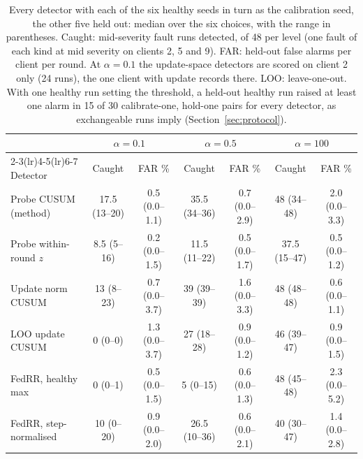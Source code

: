 \begin{table}[t]
\centering
\footnotesize
\setlength{\tabcolsep}{3pt}
\begin{tabular}{lcccccc}
\toprule
 & \multicolumn{2}{c}{$\alpha = 0.1$} & \multicolumn{2}{c}{$\alpha = 0.5$} & \multicolumn{2}{c}{$\alpha = 100$} \\
\cmidrule(lr){2-3}\cmidrule(lr){4-5}\cmidrule(lr){6-7}
Detector & Caught & FAR \% & Caught & FAR \% & Caught & FAR \% \\
\midrule
Probe CUSUM (method) & 17.5 (13--20) & 0.5 (0.0--1.1) & 35.5 (34--36) & 0.7 (0.0--2.9) & 48 (34--48) & 2.0 (0.0--3.3) \\
Probe within-round $z$ & 8.5 (5--16) & 0.2 (0.0--1.5) & 11.5 (11--22) & 0.5 (0.0--1.7) & 37.5 (15--47) & 0.5 (0.0--1.2) \\
Update norm CUSUM & 13 (8--23) & 0.7 (0.0--3.7) & 39 (39--39) & 1.6 (0.0--3.3) & 48 (48--48) & 0.6 (0.0--1.1) \\
LOO update CUSUM & 0 (0--0) & 1.3 (0.0--3.7) & 27 (18--28) & 0.9 (0.0--1.2) & 46 (39--47) & 0.9 (0.0--1.5) \\
FedRR, healthy max & 0 (0--1) & 0.5 (0.0--1.5) & 5 (0--15) & 0.6 (0.0--1.3) & 48 (45--48) & 2.3 (0.0--5.2) \\
FedRR, step-normalised & 10 (0--20) & 0.9 (0.0--2.0) & 26.5 (10--36) & 0.6 (0.0--2.1) & 40 (30--47) & 1.4 (0.0--2.8) \\
\bottomrule
\end{tabular}
\caption{Every detector with each of the six healthy seeds in turn as the calibration seed, the other five held out: median over the six choices, with the range in parentheses. Caught: mid-severity fault runs detected, of 48 per level (one fault of each kind at mid severity on clients 2, 5 and 9). FAR: held-out false alarms per client per round. At $\alpha = 0.1$ the update-space detectors are scored on client 2 only (24 runs), the one client with update records there. LOO: leave-one-out. With one healthy run setting the threshold, a held-out healthy run raised at least one alarm in 15 of 30 calibrate-one, hold-one pairs for every detector, as exchangeable runs imply (Section~\ref{sec:protocol}).}
\label{tab:rotation}
\end{table}
